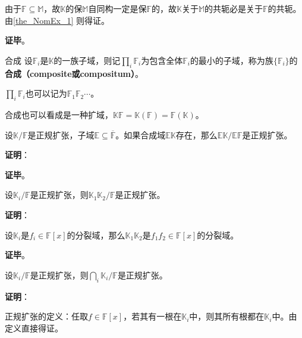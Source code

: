 
由于$\mathbb{F}\subseteq\mathbb{M}$，故$\mathbb{K}$的保$\mathbb{M}$自同构一定是保$\mathbb{F}$的，故$\mathbb{K}$关于$\mathbb{M}$的共轭必是关于$\mathbb{F}$的共轭。由\autoref{the_NomEx_1} 则得证。

\textbf{证毕}。





\begin{definition}{合成}
设$\mathbb{F}_i$是$\mathbb{K}$的一族子域，则记$\prod_{i}\mathbb{F}_i$为包含全体$\mathbb{F}_i$的最小的子域，称为族$\{\mathbb{F}_i\}$的\textbf{合成（composite或compositum）}。

$\prod_{i}\mathbb{F}_i$也可以记为$\mathbb{F}_1\mathbb{F}_2\cdots$。
\end{definition}


合成也可以看成是一种扩域，$\mathbb{K}\mathbb{F}=\mathbb{K}(\mathbb{F})=\mathbb{F}(\mathbb{K})$。


\begin{theorem}{}\label{the_NomEx_7}
设$\mathbb{K}/\mathbb{F}$是正规扩张，子域$\mathbb{E}\subseteq\overline{\mathbb{F}}$。如果合成域$\mathbb{EK}$存在，那么$\mathbb{EK}/\mathbb{EF}$是正规扩张。
\end{theorem}

\textbf{证明}：





\textbf{证毕}。






\begin{theorem}{}
设$\mathbb{K}_i/\mathbb{F}$是正规扩张，则$\mathbb{K}_1\mathbb{K}_2/\mathbb{F}$是正规扩张。
\end{theorem}


\textbf{证明}：

设$\mathbb{K}_i$是$f_i\in\mathbb{F}[x]$的分裂域，那么$\mathbb{K}_1\mathbb{K}_2$是$f_1f_2\in\mathbb{F}[x]$的分裂域。

\textbf{证毕}。


\begin{theorem}{}\label{the_NomEx_2}
设$\mathbb{K}_i/\mathbb{F}$是正规扩张，则$\bigcap_{i}\mathbb{K}_i/\mathbb{F}$是正规扩张。
\end{theorem}

\textbf{证明}：

正规扩张的定义：任取$f\in\mathbb{F}[x]$，若其有一根在$\mathbb{K}_i$中，则其所有根都在$\mathbb{K}_i$中。由定义直接得证。


